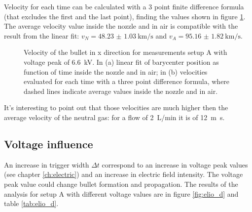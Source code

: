 Velocity for each time can be calculated with a 3 point finite difference formula (that excludes the first and the last point), finding the values shown in figure \ref{fig:elio_d035_vx}. The average velocity value inside the nozzle and in air is compatible with the result from the linear fit: $v_{N} = \SI{48.23(103)}{\kilo\meter/\second}$ and $v_{A} = \SI{95.16(182)}{\kilo\meter/\second}$.
\begin{figure}
 \centering
 \hfill
 \caption{Velocity of the bullet in x direction for measurements setup A with voltage peak of \SI{6.6}{\kilo\volt}. In (a) linear fit of barycenter position as function of time inside the nozzle and in air; in (b) velocities evaluated for each time with a three point difference formula, where dashed lines indicate average values inside the nozzle and in air.}
 \label{fig:elio_d035_vx}
\end{figure}

It's interesting to point out that those velocities are much higher then the average velocity of the neutral gas: for a flow of \SI{2}{\liter/\minute} it is of \SI{12}{\meter\second}.


\subsection{Voltage influence}
An increase in trigger width $\Delta t$ correspond to an increase in voltage peak values (see chapter \ref{ch:electric}) and an increase in electric field intensity. The voltage peak value could change bullet formation and propagation. The results of the analysis for setup A with different voltage values are in figure \ref{fig:elio_d} and table \ref{tab:elio_d}.


